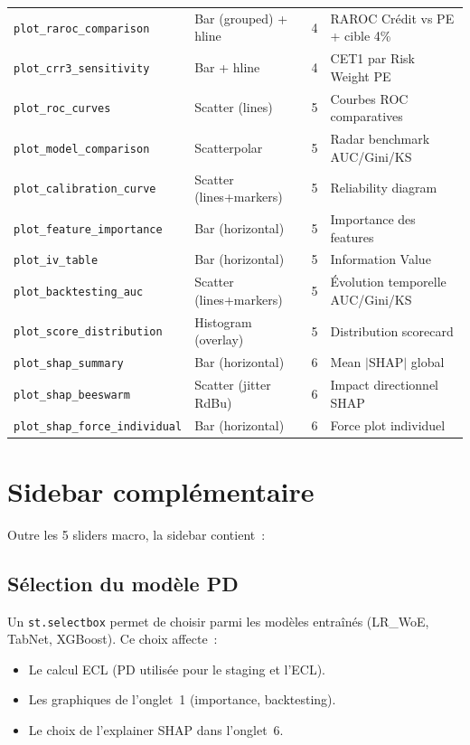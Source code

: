 \documentclass[12pt,a4paper]{article}
\begin{document}
\begin{longtable}{@{}lp{3.5cm}lp{4cm}@{}}
\texttt{plot\_raroc\_comparison} & Bar (grouped) + hline & 4 & RAROC Cr\'edit vs PE + cible 4\% \\
\texttt{plot\_crr3\_sensitivity} & Bar + hline & 4 & CET1 par Risk Weight PE \\
\texttt{plot\_roc\_curves} & Scatter (lines) & 5 & Courbes ROC comparatives \\
\texttt{plot\_model\_comparison} & Scatterpolar & 5 & Radar benchmark AUC/Gini/KS \\
\texttt{plot\_calibration\_curve} & Scatter (lines+markers) & 5 & Reliability diagram \\
\texttt{plot\_feature\_importance} & Bar (horizontal) & 5 & Importance des features \\
\texttt{plot\_iv\_table} & Bar (horizontal) & 5 & Information Value \\
\texttt{plot\_backtesting\_auc} & Scatter (lines+markers) & 5 & \'Evolution temporelle AUC/Gini/KS \\
\texttt{plot\_score\_distribution} & Histogram (overlay) & 5 & Distribution scorecard \\
\texttt{plot\_shap\_summary} & Bar (horizontal) & 6 & Mean $|$SHAP$|$ global \\
\texttt{plot\_shap\_beeswarm} & Scatter (jitter RdBu) & 6 & Impact directionnel SHAP \\
\texttt{plot\_shap\_force\_individual} & Bar (horizontal) & 6 & Force plot individuel \\
\bottomrule
\end{longtable}


\section{Sidebar compl\'ementaire}
\label{sec:sidebar_extra}

Outre les 5 sliders macro, la sidebar contient~:

\subsection{S\'election du mod\`ele PD}

Un \texttt{st.selectbox} permet de choisir parmi les mod\`eles entra\^{i}n\'es (LR\_WoE, TabNet, XGBoost). Ce choix affecte~:
\begin{itemize}[leftmargin=2em]
    \item Le calcul ECL (PD utilis\'ee pour le staging et l'ECL).
    \item Les graphiques de l'onglet~1 (importance, backtesting).
    \item Le choix de l'explainer SHAP dans l'onglet~6.
\end{itemize}
\end{document}
